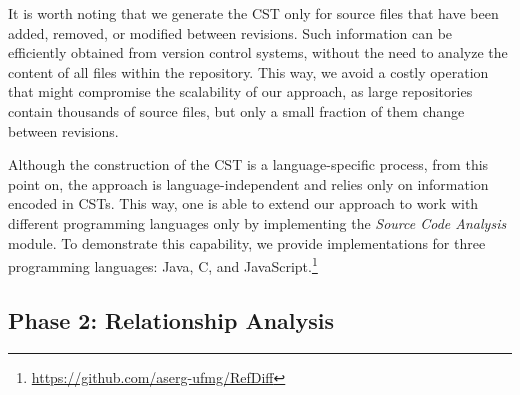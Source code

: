 It is worth noting that we generate the CST only for source files that have been added, removed, or modified between revisions. 
Such information can be efficiently obtained from version control systems, without the need to analyze the content of all files within the repository.
This way, we avoid a costly operation that might compromise the scalability of our approach, as large repositories contain thousands of source files, but only a small fraction of them change between revisions.

Although the construction of the CST is a language-specific process, from this point on, the approach is language-independent and relies only on information encoded in CSTs.
This way, one is able to extend our approach to work with different programming languages only by implementing the \emph{Source Code Analysis} module.
To demonstrate this capability, we provide implementations for three programming languages: Java, C, and JavaScript.\footnote{\url{https://github.com/aserg-ufmg/RefDiff}}


\subsection{Phase 2: Relationship Analysis}


